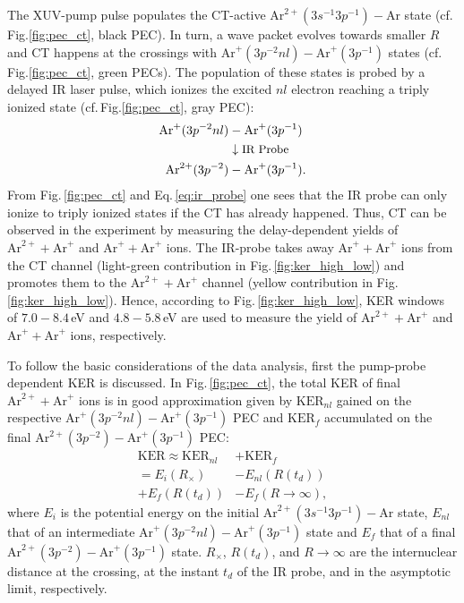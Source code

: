 \documentclass[%
 aip,
rsi,%
 amsmath,amssymb,
preprint,%
]{revtex4-1}
\begin{document}
The XUV-pump pulse populates the CT-active $\mathrm{Ar}^{2+}(3s^{-1}3p^{-1}) -\mathrm{Ar}$ state (cf.\,Fig.\ref{fig:pec_ct}, black PEC). In turn, a wave packet evolves towards smaller $R$ and CT happens at the crossings with $\mathrm{Ar}^{+}(3p^{-2}nl) - \mathrm{Ar}^+(3p^{-1})$ states (cf.\,Fig.\ref{fig:pec_ct}, green PECs). The population of these states is probed by a delayed IR laser pulse, which ionizes the excited $nl$ electron reaching a triply ionized state (cf.\,Fig.\ref{fig:pec_ct}, gray PEC):
%
	\begin{align}
	\mathrm{Ar}^{+}(3p^{-2}nl) &- \mathrm{Ar}^{+}(3p^{-1}) \nonumber \\ 
	&\downarrow \text{\small{IR Probe}} \nonumber \\
	\mathrm{Ar}^{2+}(3p^{-2}) &- \mathrm{Ar}^{+}(3p^{-1}).	
	  \label{eq:ir_probe}
	\end{align}	
%
From Fig.\,\ref{fig:pec_ct} and Eq.\,\ref{eq:ir_probe} one sees that the IR probe can only ionize to triply ionized states if the CT has already happened. Thus, CT can be observed in the experiment by measuring the delay-dependent yields of $\mathrm{Ar}^{2+} + \mathrm{Ar}^{+}$ and $\mathrm{Ar}^{+} + \mathrm{Ar}^{+}$ ions. The IR-probe takes away $\mathrm{Ar}^{+} + \mathrm{Ar}^{+}$ ions from the CT channel (light-green contribution in Fig.\,\ref{fig:ker_high_low}) and promotes them to the $\mathrm{Ar}^{2+} + \mathrm{Ar}^{+}$ channel (yellow contribution in Fig.\,\ref{fig:ker_high_low}). Hence, according to Fig.\,\ref{fig:ker_high_low}, KER windows of $7.0 - 8.4$\,eV and $4.8 - 5.8$\,eV are used to measure the yield of $\mathrm{Ar}^{2+} +\mathrm{Ar}^{+}$ and $\mathrm{Ar}^{+} +\mathrm{Ar}^{+}$ ions, respectively. 


To follow the basic considerations of the data analysis, first the pump-probe dependent KER is discussed. In Fig.\,\ref{fig:pec_ct}, the total KER of final $\mathrm{Ar}^{2+} + \mathrm{Ar}^{+}$ ions is in good approximation given by $\mathrm{KER}_{nl}$ gained on the respective $\mathrm{Ar}^{+}(3p^{-2}nl) - \mathrm{Ar}^{+}(3p^{-1})$ PEC and $\mathrm{KER}_{f}$ accumulated on the final $\mathrm{Ar}^{2+}(3p^{-2}) - \mathrm{Ar}^{+}(3p^{-1})$ PEC:
%
	\begin{align}
  \mathrm{KER} \approx \mathrm{KER}_{nl} &+ \mathrm{KER}_f \nonumber \\
  = E_i (R_{\times}) &- E_{nl} (R(t_d)) \nonumber \\ 
  + E_f(R(t_d)) &- E_f (R \rightarrow \infty),
   \label{eq:ker_cc_pump_probe}
	\end{align}	
%
where $E_i$ is the potential energy on the initial $\mathrm{Ar}^{2+}(3s^{-1} 3p^{-1}) - \mathrm{Ar}$ state, $E_{nl}$ that of an intermediate $\mathrm{Ar}^{+}(3p^{-2}nl) - \mathrm{Ar}^{+}(3p^{-1})$ state and $E_f$ that of a final $\mathrm{Ar}^{2+}(3p^{-2}) - \mathrm{Ar}^{+}(3p^{-1})$ state. $R_{\times}$, $R(t_d)$, and $R \rightarrow \infty$ are the internuclear distance at the crossing, at the instant $t_d$ of the IR probe, and in the asymptotic limit, respectively.
\end{document}
